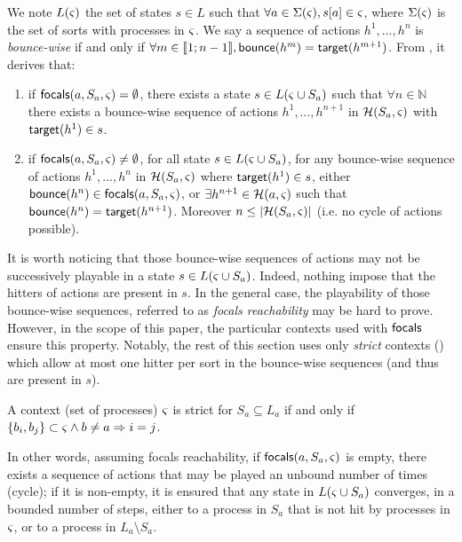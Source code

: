 We note $L(\varsigma)$ the set of states $s\in L$ such that $\forall a\in\Sigma(\varsigma), {s[a]}\in\varsigma$,
where $\Sigma(\varsigma)$ is the set of sorts with processes in $\varsigma$.
We say a sequence of actions $h^1,\dots,h^n$ is \emph{bounce-wise} if and only if
$\forall m\in\llbracket 1 ; n-1 \rrbracket, \mathsf{bounce}(h^m)=\mathsf{target}(h^{m+1})$.
From , it derives that:
\begin{enumerate}
\item if $\mathsf{focals}(a,S_a,\varsigma)=\emptyset$, there exists a 
state $s\in L(\varsigma\cup S_a)$ such that $\forall n\in\mathbb N$ there
exists a bounce-wise sequence of actions $h^1,\dots,h^{n+1}$ in $\mathcal{H}(S_a,\varsigma)$ 
with $\mathsf{target}(h^1)\in s$.
\item if $\mathsf{focals}(a,S_a,\varsigma)\neq\emptyset$, for all
state $s\in L(\varsigma\cup S_a)$,
for any bounce-wise sequence of actions $h^1,\dots,h^n$ in $\mathcal{H}(S_a,\varsigma)$ where $\mathsf{target}(h^1)\in
s$,
either
 $\mathsf{bounce}(h^n) \in \mathsf{focals}(a,S_a,\varsigma)$,
or
$\exists h^{n+1}\in \mathcal{H}(a,\varsigma)$ such that $\mathsf{bounce}(h^n) = \mathsf{target}(h^{n+1})$.
Moreover $n\leq|\mathcal{H}(S_a,\varsigma)|$ (i.e. no cycle of actions possible).
\end{enumerate}

It is worth noticing that those bounce-wise sequences of actions may not be successively playable in
a state $s\in L(\varsigma\cup S_a)$.
Indeed, nothing impose that the hitters of actions are present in $s$.
In the general case, the playability of those bounce-wise sequences, referred to as \emph{focals
reachability} may be hard to prove.
However, in the scope of this paper, the particular contexts used with $\mathsf{focals}$ ensure this property.
Notably, the rest of this section uses only \emph{strict} contexts () which
allow at most one hitter per sort in the bounce-wise sequences (and thus are present in $s$).

\begin{definition}\label{def:strict-ctx}
A context (set of processes) $\varsigma$ is strict for $S_a\subseteq L_a$ if and only if
$\{b_i,b_j\} \subset \varsigma \wedge b\neq a \Rightarrow i=j$.
\end{definition}

In other words, assuming focals reachability, if $\mathsf{focals}(a,S_a,\varsigma)$ is empty, there exists a
sequence of actions that may be played an unbound number of times (cycle);
if it is non-empty, it is ensured that any state in $L(\varsigma\cup S_a)$ converges, in a bounded
number of steps, either to a process in $S_a$ that is not hit by processes in $\varsigma$, or to a process in
$L_a\setminus S_a$.

